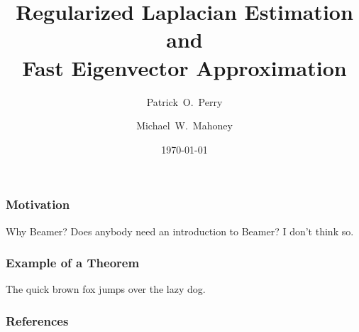 \documentclass{beamer}
\title{Regularized Laplacian Estimation and \\ Fast Eigenvector Approximation}
\author{Patrick~O.~Perry \and Michael~W.~Mahoney}
\institute[NYU Stern and Stanford] {
  NYU Stern School of Business \and Stanford University
}
\date{\today}
\begin{document}
\begin{frame}
  \titlepage
\end{frame}

\begin{frame}\frametitle{Motivation}
  \begin{block}{Why Beamer?}
    Does anybody need an introduction to Beamer? I don't think so.
  \end{block}
\end{frame}

\begin{frame}\frametitle{Example of a Theorem}
  \begin{theorem}
    The quick brown fox jumps over the lazy dog.
  \end{theorem}
\end{frame}

\begin{frame}
  \frametitle{References}
  
  \footnotesize{
    
  }
\end{frame}
\end{document}
